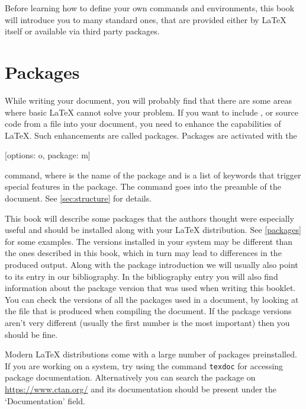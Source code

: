 Before learning how to define your own commands and environments, this book
will introduce you to many standard ones, that are provided either by \LaTeX{}
itself or available via third party packages.

\section{Packages} While writing your document, you will
probably find that there are some areas where basic \LaTeX{} cannot solve your
problem. If you want to include ,  or source
code from a file into your document, you need to enhance the capabilities of
\LaTeX. Such enhancements are called packages. Packages are activated with the
\begin{lscommand}
  [options: o, package: m]
\end{lscommand}
command, where  is the name of the package and
 is a list of keywords that trigger special features in
the package. The  command goes into the preamble of the
document. See \autoref{sec:structure} for details.

This book will describe some packages that the authors thought were especially
useful and should be installed along with your \LaTeX{} distribution. See
\autoref{packages} for some examples. The versions installed in your system may be different than
the ones described in this book, which in turn may lead to differences in the
produced output. Along with the package introduction we will usually also point
to its entry in our bibliography. In the bibliography entry you will also find
information about the package version that was used when writing this booklet.
You can check the versions of all the packages used in a document, by looking
at the  file that is produced when compiling the document. If the
package versions aren't very different (usually the first number is the most
important) then you should be fine.

Modern \LaTeX{} distributions come with a large number of packages
preinstalled. If you are working on a \Unix{} system, try using the command
\texttt{texdoc} for accessing package documentation. Alternatively you can
search the package on \url{https://www.ctan.org/} and its documentation should
be present under the \enquote*{Documentation} field.

